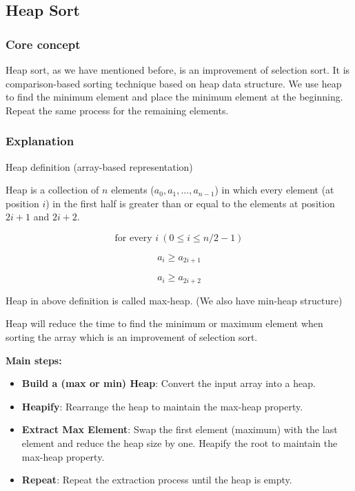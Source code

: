 \subsection{Heap Sort}

\subsubsection{Core concept}
Heap sort, as we have mentioned before, is an improvement of selection sort. It is comparison-based sorting technique based on heap data structure. We use heap to find the minimum element and place the minimum element at the beginning. Repeat the same process for the remaining elements.

\subsubsection{Explanation}
Heap definition (array-based representation) ~\cite{ref1}

\vspace{5pt}

Heap is a collection of $n$ elements ($a_0, a_1, \ldots, a_{n-1}$) in which every element (at position $i$) in the first half is greater than or equal to the elements at position $2i+1$ and $2i+2$.

\[
\text{for every } i \ (0 \leq i \leq n/2 - 1)
\]

\[
a_i \geq a_{2i + 1}
\]

\[
a_i \geq a_{2i + 2}
\]

Heap in above definition is called max-heap. (We also have min-heap structure)

\vspace{5pt}

Heap will reduce the time to find the minimum or maximum element when sorting the array which is an improvement of selection sort.

\textbf{Main steps:}
\begin{itemize}
    \item \textbf{Build a (max or min) Heap}: Convert the input array into a heap.
    \item \textbf{Heapify}: Rearrange the heap to maintain the max-heap property.
    \item \textbf{Extract Max Element}: Swap the first element (maximum) with the last element and reduce the heap size by one. Heapify the root to maintain the max-heap property.
    \item \textbf{Repeat}: Repeat the extraction process until the heap is empty.
\end{itemize}

